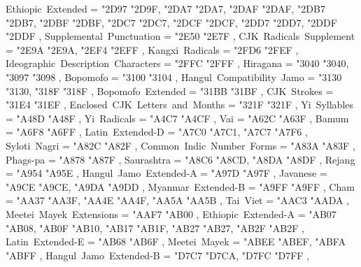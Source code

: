 {    Ethiopic~Extended                              = { {"2D97} {"2D9F}, {"2DA7} {"2DA7}, {"2DAF} {"2DAF}, {"2DB7} {"2DB7}, {"2DBF} {"2DBF}, {"2DC7} {"2DC7}, {"2DCF} {"2DCF}, {"2DD7} {"2DD7}, {"2DDF} {"2DDF} },
    Supplemental~Punctuation                       = { {"2E50} {"2E7F} },
    CJK~Radicals~Supplement                        = { {"2E9A} {"2E9A}, {"2EF4} {"2EFF} },
    Kangxi~Radicals                                = { {"2FD6} {"2FEF} },
    Ideographic~Description~Characters             = { {"2FFC} {"2FFF} },
    Hiragana                                       = { {"3040} {"3040}, {"3097} {"3098} },
    Bopomofo                                       = { {"3100} {"3104} },
    Hangul~Compatibility~Jamo                      = { {"3130} {"3130}, {"318F} {"318F} },
    Bopomofo~Extended                              = { {"31BB} {"31BF} },
    CJK~Strokes                                    = { {"31E4} {"31EF} },
    Enclosed~CJK~Letters~and~Months                = { {"321F} {"321F} },
    Yi~Syllables                                   = { {"A48D} {"A48F} },
    Yi~Radicals                                    = { {"A4C7} {"A4CF} },
    Vai                                            = { {"A62C} {"A63F} },
    Bamum                                          = { {"A6F8} {"A6FF} },
    Latin~Extended-D                               = { {"A7C0} {"A7C1}, {"A7C7} {"A7F6} },
    Syloti~Nagri                                   = { {"A82C} {"A82F} },
    Common~Indic~Number~Forms                      = { {"A83A} {"A83F} },
    Phags-pa                                       = { {"A878} {"A87F} },
    Saurashtra                                     = { {"A8C6} {"A8CD}, {"A8DA} {"A8DF} },
    Rejang                                         = { {"A954} {"A95E} },
    Hangul~Jamo~Extended-A                         = { {"A97D} {"A97F} },
    Javanese                                       = { {"A9CE} {"A9CE}, {"A9DA} {"A9DD} },
    Myanmar~Extended-B                             = { {"A9FF} {"A9FF} },
    Cham                                           = { {"AA37} {"AA3F}, {"AA4E} {"AA4F}, {"AA5A} {"AA5B} },
    Tai~Viet                                       = { {"AAC3} {"AADA} },
    Meetei~Mayek~Extensions                        = { {"AAF7} {"AB00} },
    Ethiopic~Extended-A                            = { {"AB07} {"AB08}, {"AB0F} {"AB10}, {"AB17} {"AB1F}, {"AB27} {"AB27}, {"AB2F} {"AB2F} },
    Latin~Extended-E                               = { {"AB68} {"AB6F} },
    Meetei~Mayek                                   = { {"ABEE} {"ABEF}, {"ABFA} {"ABFF} },
    Hangul~Jamo~Extended-B                         = { {"D7C7} {"D7CA}, {"D7FC} {"D7FF} },
}
